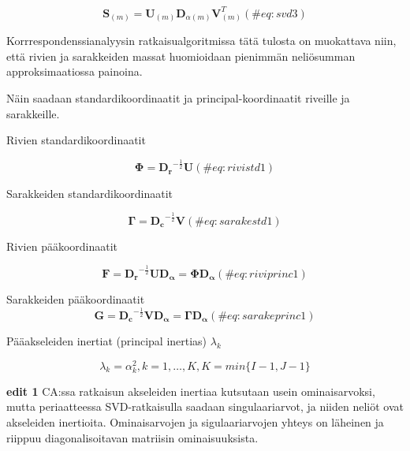 \documentclass[
  finnish,
]{book}
\begin{document}
\begin{equation}
\boldsymbol{S}_{(m)} = \boldsymbol{U}_{(m)} \boldsymbol{D}_{\alpha(m)} \boldsymbol{V}_{(m)}^{T}
(\#eq:svd3)
\end{equation}

Korrrespondenssianalyysin ratkaisualgoritmissa tätä tulosta on
muokattava niin, että rivien ja sarakkeiden massat huomioidaan pienimmän
neliösumman approksimaatiossa painoina.

Näin saadaan standardikoordinaatit ja principal-koordinaatit riveille ja
sarakkeille.

Rivien standardikoordinaatit

\begin{equation}
\boldsymbol{\Phi} = \boldsymbol{D_r}^{-\frac{1}{2}} \boldsymbol{U} \label{B}
(\#eq:rivistd1)
\end{equation}

Sarakkeiden standardikoordinaatit

\begin{equation}
 \boldsymbol{\Gamma} = \boldsymbol{D_c}^{-\frac{1}{2}} \boldsymbol{V} \label{C}
 (\#eq:sarakestd1)
\end{equation}

Rivien pääkoordinaatit

\begin{equation}
 \boldsymbol{F} =   \boldsymbol{D_r}^{-\frac{1}{2}} \boldsymbol{U}  \boldsymbol{D_{\alpha}} = \boldsymbol{\Phi} \boldsymbol{D_{\alpha}} \label{D}
(\#eq:riviprinc1)
\end{equation}

Sarakkeiden pääkoordinaatit \begin{equation}
 \boldsymbol{G}  = \boldsymbol{D_c}^{-\frac{1}{2}} \boldsymbol{V} \boldsymbol{D_{\alpha}} = \boldsymbol{\Gamma}  \boldsymbol{D_{\alpha}} \label{E}
 (\#eq:sarakeprinc1)
\end{equation}

Pääakseleiden inertiat (principal inertias) \(\lambda_{k}\)

\begin{equation}
\lambda_{k} = \alpha_{k}^2, k = 1,\dots,K,
K = min \{ I-1, J-1 \}
\end{equation}

\textbf{edit 1} CA:ssa ratkaisun akseleiden inertiaa kutsutaan usein
ominaisarvoksi, mutta periaatteessa SVD-ratkaisulla saadaan
singulaariarvot, ja niiden neliöt ovat akseleiden inertioita.
Ominaisarvojen ja sigulaariarvojen yhteys on läheinen ja riippuu
diagonalisoitavan matriisin ominaisuuksista.
\end{document}
